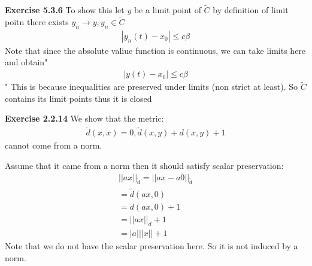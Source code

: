 \documentclass[12pt]{article}
\newenvironment{exercise}[1]{\vspace{.1in}\noindent\textbf{Exercise #1 \hspace{.05em}}}{}
\theoremstyle{definition}
\theoremstyle{remark}
\begin{document}
\begin{exercise}{5.3.6}
	To show this let $y$ be a limit point of $\tilde C$ by definition of limit poitn there exists $y_n\rightarrow y, y_n\in \tilde C$
	\begin{align}
		|y_n(t)-x_0|\leq c\beta
	\end{align}
	Note that since the absolute valiue function is continuous, we can take limits here and obtain"
	\begin{align}
		|y(t)-x_0|\leq c\beta
	\end{align}"
	This is because inequalities are preserved under limits (non strict at least). So $\tilde C$ contains its limit points thus it is closed
\end{exercise}


\begin{exercise}{2.2.14}
	We show that the metric:
	\begin{align}
		\tilde{d}(x,x)=0,\tilde d(x,y)+d(x,y)+1
	\end{align}
	cannot come from a norm.

	Assume that it came from a norm then it should satisfy scalar preservation:
	\begin{align}
		||ax||_{ \tilde{d}}=||ax-a0||_{ \tilde{d}} \\
		=\tilde d(ax,0)                            \\
		=d(ax,0)+1                                 \\
		=||ax||_d+1                                \\
		=|a|||x||+1
	\end{align}
	Note that we do not have the scalar preservation here. So it is not induced by a norm.
\end{exercise}
\end{document}
